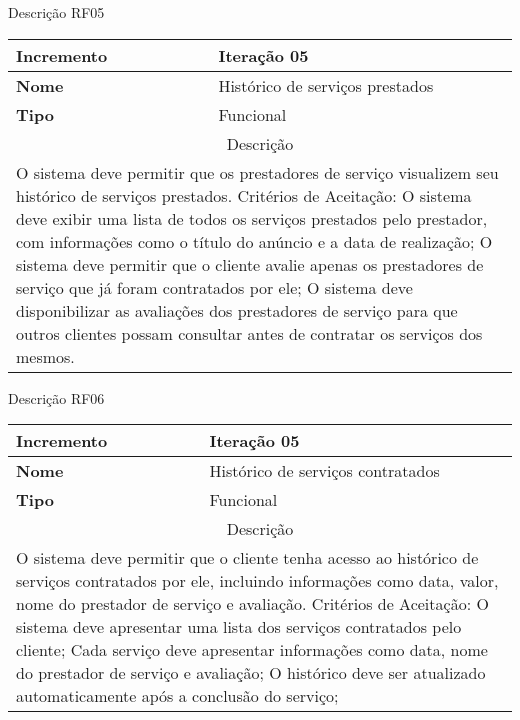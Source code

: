 \begin{quadro}[htb]
	\centering
	\caption{\label{Formatação do texto.}Descrição RF05}	
	\begin{tabular}{|l|p{11cm}|}
		\hline
		\textbf{Incremento}    & Iteração 05\\ \hline
		\textbf{Nome}    & Histórico de serviços prestados\\ \hline
		\textbf{Tipo}    & Funcional\\ \hline
		\multicolumn{2}{|c|}{Descrição}\\ \hline
		\multicolumn{2}{|p{12cm}|}{
			O sistema deve permitir que os prestadores de serviço visualizem seu histórico de serviços prestados. \newline
			\newline Critérios de Aceitação: \newline
			O sistema deve exibir uma lista de todos os serviços prestados pelo prestador, com informações como o título do anúncio e a data de realização; \newline
			\newline O sistema deve permitir que o cliente avalie apenas os prestadores de serviço que já foram contratados por ele; \newline
			\newline O sistema deve disponibilizar as avaliações dos prestadores de serviço para que outros clientes possam consultar antes de contratar os serviços dos mesmos.
			} \\ \hline
	\end{tabular}
\end{quadro}

\begin{quadro}[htb]
	\centering
	\caption{\label{Formatação do texto.}Descrição RF06}	
	\begin{tabular}{|l|p{11cm}|}
		\hline
		\textbf{Incremento}    & Iteração 05\\ \hline
		\textbf{Nome}    & Histórico de serviços contratados\\ \hline
		\textbf{Tipo}    & Funcional\\ \hline
		\multicolumn{2}{|c|}{Descrição}\\ \hline
		\multicolumn{2}{|p{12cm}|}{
			O sistema deve permitir que o cliente tenha acesso ao histórico de serviços contratados por ele, incluindo informações como data, valor, nome do prestador de serviço e avaliação. \newline
			\newline Critérios de Aceitação: \newline
			O sistema deve apresentar uma lista dos serviços contratados pelo cliente; \newline
            Cada serviço deve apresentar informações como data, nome do prestador de serviço e avaliação; \newline
			\newline O histórico deve ser atualizado automaticamente após a conclusão do serviço;
			} \\ \hline
	\end{tabular}
\end{quadro}



